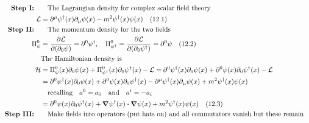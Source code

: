 \documentclass{article}
\begin{document}
\begin{align*}
  \qq*{\textbf{Step I:}}   & \qq{The Lagrangian density for complex scalar field theory}                                                                                                                                    \\
  \mathcal{L}              & =\partial^\mu\psi^\dagger(x)\partial_\mu\psi(x)-m^2\psi^\dagger(x)\psi(x)\qq{(12.1)}                                                                                                           \\
  \qq*{\textbf{Step II:}}  & \qq{The momentum density for the two fields}                                                                                                                                                   \\
  \Pi^0_\psi               & =\pdv{\mathcal{L}}{(\partial_0\psi)}=
  \partial^0\psi^\dagger\qcomma\Pi^0_{\psi^\dagger}=\pdv{\mathcal{L}}{(\partial_0\psi^\dagger)}=
  \partial^0\psi\qq{(12.2)}                                                                                                                                                                                                 \\
                           & \qq*{The Hamiltonian density is}                                                                                                                                                               \\
  \mathcal{H}              & =\Pi^0_\psi(x)\partial_0\psi(x)+\Pi^0_{\psi^\dagger}(x)\partial_0\psi^\dagger(x)-\mathcal{L}=\partial^0\psi^\dagger(x)\partial_0\psi(x)+\partial^0\psi(x)\partial_0\psi^\dagger(x)-\mathcal{L} \\
                           & =\partial^0\psi^\dagger(x)\partial_0\psi(x)+\partial^0\psi(x)\partial_0\psi^\dagger(x)-\partial^\mu\psi^\dagger(x)\partial_\mu\psi(x)+m^2\psi^\dagger(x)\psi(x)                                \\
                           & \qq{recalling}a^0=a_0\qand a^i=-a_i                                                                                                                                                            \\
                           & =\partial^0\psi(x)\partial_0\psi^\dagger(x)+\grad\psi^\dagger(x)\vdot\grad\psi(x)+m^2\psi^\dagger(x)\psi(x)\qq{(12.3)}                                                                         \\
  \qq*{\textbf{Step III:}} & \qq{Make fields into operators (put hats on) and all commutators vanish but these remain}                                                                                                      \\

\end{align*}
\end{document}
